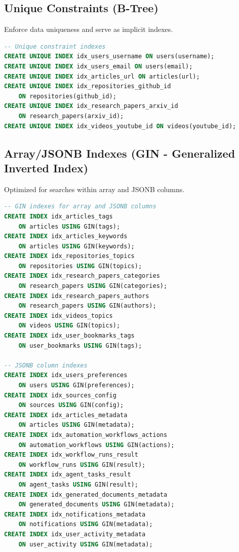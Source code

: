 \documentclass[12pt,a4paper]{report}
\begin{document}
\subsection{Unique Constraints (B-Tree)}

Enforce data uniqueness and serve as implicit indexes.

\begin{lstlisting}[language=SQL,basicstyle=\ttfamily\small]
-- Unique constraint indexes
CREATE UNIQUE INDEX idx_users_username ON users(username);
CREATE UNIQUE INDEX idx_users_email ON users(email);
CREATE UNIQUE INDEX idx_articles_url ON articles(url);
CREATE UNIQUE INDEX idx_repositories_github_id 
    ON repositories(github_id);
CREATE UNIQUE INDEX idx_research_papers_arxiv_id 
    ON research_papers(arxiv_id);
CREATE UNIQUE INDEX idx_videos_youtube_id ON videos(youtube_id);
\end{lstlisting}

\subsection{Array/JSONB Indexes (GIN - Generalized Inverted Index)}

Optimized for searches within array and JSONB columns.

\begin{lstlisting}[language=SQL,basicstyle=\ttfamily\small]
-- GIN indexes for array and JSONB columns
CREATE INDEX idx_articles_tags 
    ON articles USING GIN(tags);
CREATE INDEX idx_articles_keywords 
    ON articles USING GIN(keywords);
CREATE INDEX idx_repositories_topics 
    ON repositories USING GIN(topics);
CREATE INDEX idx_research_papers_categories 
    ON research_papers USING GIN(categories);
CREATE INDEX idx_research_papers_authors 
    ON research_papers USING GIN(authors);
CREATE INDEX idx_videos_topics 
    ON videos USING GIN(topics);
CREATE INDEX idx_user_bookmarks_tags 
    ON user_bookmarks USING GIN(tags);

-- JSONB column indexes
CREATE INDEX idx_users_preferences 
    ON users USING GIN(preferences);
CREATE INDEX idx_sources_config 
    ON sources USING GIN(config);
CREATE INDEX idx_articles_metadata 
    ON articles USING GIN(metadata);
CREATE INDEX idx_automation_workflows_actions 
    ON automation_workflows USING GIN(actions);
CREATE INDEX idx_workflow_runs_result 
    ON workflow_runs USING GIN(result);
CREATE INDEX idx_agent_tasks_result 
    ON agent_tasks USING GIN(result);
CREATE INDEX idx_generated_documents_metadata 
    ON generated_documents USING GIN(metadata);
CREATE INDEX idx_notifications_metadata 
    ON notifications USING GIN(metadata);
CREATE INDEX idx_user_activity_metadata 
    ON user_activity USING GIN(metadata);
\end{lstlisting}
\end{document}
